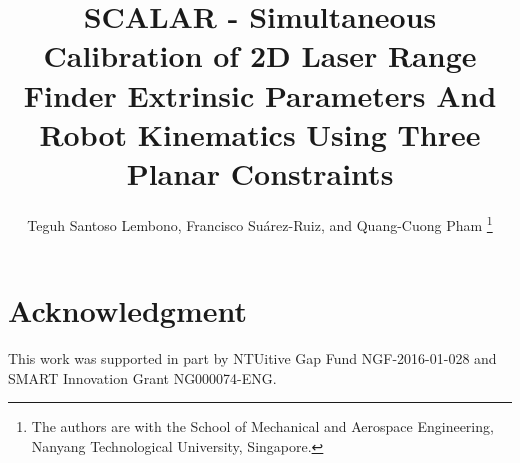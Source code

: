 \documentclass[letterpaper, 10 pt, conference]{ieeeconf}
\title{\LARGE
  \textbf{SCALAR - Simultaneous Calibration of 2D Laser Range Finder Extrinsic Parameters And Robot Kinematics Using Three Planar Constraints}}
\author{Teguh Santoso Lembono, Francisco Su\'{a}rez-Ruiz, and Quang-Cuong Pham%
  \thanks{The authors are with the School of Mechanical and Aerospace
          Engineering, Nanyang Technological University, Singapore.}}
\begin{document}
\maketitle
\thispagestyle{empty}
\pagestyle{empty}








\section*{Acknowledgment}
This work was supported in part by NTUitive Gap Fund NGF-2016-01-028
and SMART Innovation Grant NG000074-ENG.




\end{document}

